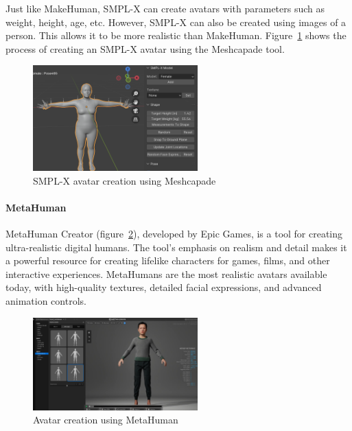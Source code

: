 \documentclass[../../main.tex]{subfiles}
\begin{document}
Just like MakeHuman, SMPL-X can create avatars with parameters such as weight, height, age, etc. However, SMPL-X can also be created using images of a person. This allows it to be more realistic than MakeHuman. Figure~\ref{fig:smpl_creation_example} shows the process of creating an SMPL-X avatar using the Meshcapade tool.

\begin{figure} 
  \centering \includegraphics[width = 2.5in]{chapters/background_work/images/smpl_creation_example.png} 
  \caption{SMPL-X avatar creation using Meshcapade} 
  \label{fig:smpl_creation_example} 
\end{figure}

\paragraph{MetaHuman}
\label{ch:background_work:sign_language_synthesis:3d_techniques:procedural_avatar_creation:metahuman}

MetaHuman Creator (figure~\ref{fig:metahuman_example}), developed by Epic Games, is a tool for creating ultra-realistic digital humans. The tool's emphasis on realism and detail makes it a powerful resource for creating lifelike characters for games, films, and other interactive experiences. MetaHumans are the most realistic avatars available today, with high-quality textures, detailed facial expressions, and advanced animation controls.

\begin{figure} 
  \centering \includegraphics[width = 2.5in]{chapters/background_work/images/metahuman_example.png} 
  \caption{Avatar creation using MetaHuman} 
  \label{fig:metahuman_example}
\end{figure}
\end{document}
